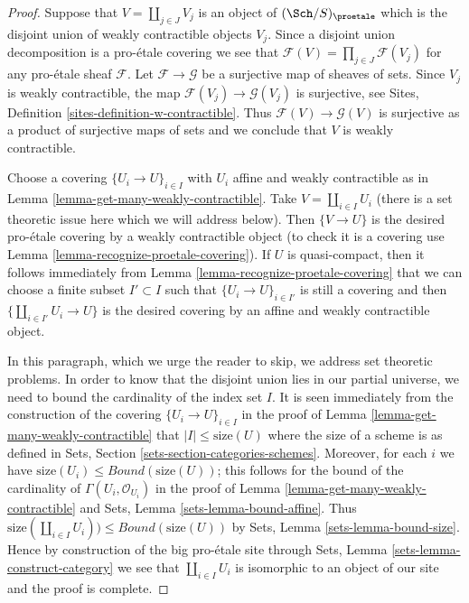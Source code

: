 \begin{proof}
Suppose that $V = \coprod_{j \in J} V_j$ is an object of $(\Sch/S)_\proetale$
which is the disjoint union of weakly contractible objects $V_j$.
Since a disjoint union decomposition is a pro-\'etale covering we
see that $\mathcal{F}(V) = \prod_{j \in J} \mathcal{F}(V_j)$ for any
pro-\'etale sheaf $\mathcal{F}$. Let $\mathcal{F} \to \mathcal{G}$
be a surjective map of sheaves of sets. Since $V_j$ is weakly contractible,
the map $\mathcal{F}(V_j) \to \mathcal{G}(V_j)$ is surjective, see
Sites, Definition \ref{sites-definition-w-contractible}.
Thus $\mathcal{F}(V) \to \mathcal{G}(V)$ is surjective as a product
of surjective maps of sets and we conclude that $V$ is weakly contractible.

\medskip\noindent
Choose a covering $\{U_i \to U\}_{i \in I}$ with $U_i$ affine and
weakly contractible as in Lemma \ref{lemma-get-many-weakly-contractible}.
Take $V = \coprod_{i \in I} U_i$ (there is a set theoretic issue here
which we will address below). Then $\{V \to U\}$ is the desired
pro-\'etale covering by a weakly contractible object
(to check it is a covering use
Lemma \ref{lemma-recognize-proetale-covering}).
If $U$ is quasi-compact, then it follows immediately from
Lemma \ref{lemma-recognize-proetale-covering}
that we can choose a finite subset $I' \subset I$ such that
$\{U_i \to U\}_{i \in I'}$ is still a covering
and then $\{\coprod_{i \in I'} U_i \to U\}$ is the desired covering
by an affine and weakly contractible object.

\medskip\noindent
In this paragraph, which we urge the reader to skip, we address
set theoretic problems. In order to know that the disjoint union
lies in our partial universe, we need to bound the cardinality of
the index set $I$. It is seen immediately from the construction of
the covering $\{U_i \to U\}_{i \in I}$ in the proof of
Lemma \ref{lemma-get-many-weakly-contractible}
that $|I| \leq \text{size}(U)$ where the size of a scheme is as
defined in Sets, Section \ref{sets-section-categories-schemes}.
Moreover, for each $i$ we have
$\text{size}(U_i) \leq Bound(\text{size}(U))$;
this follows for the bound of the cardinality of
$\Gamma(U_i, \mathcal{O}_{U_i})$ in
the proof of Lemma \ref{lemma-get-many-weakly-contractible}
and Sets, Lemma \ref{sets-lemma-bound-affine}.
Thus $\text{size}(\coprod_{i \in I} U_i)) \leq Bound(\text{size}(U))$
by Sets, Lemma \ref{sets-lemma-bound-size}.
Hence by construction of the big pro-\'etale site through
Sets, Lemma \ref{sets-lemma-construct-category}
we see that $\coprod_{i \in I} U_i$ is isomorphic to an object
of our site and the proof is complete.
\end{proof}






